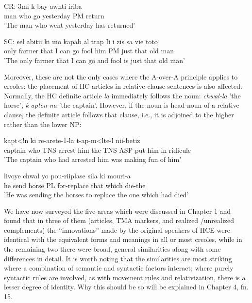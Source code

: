 \ea\label{ex:48}
 \gll CR: 3mi k bay awnti iriba\\
man who go yesterday PM return\\
\glt 'The man who went yesterday has returned'
\z





\ea\label{ex:49}
 SC: sel abitii ki mo kapab al trap Ii i zis sa vie toto\\
 only farmer that I can go fool him PM just that old man  \\
\glt 'The only farmer that I can go and fool is just that old man'
\z



Moreover, these are not the only cases where the A-over-A principle applies to creoles: the placement of HC articles in relative\-
clause sentences is also affected. Normally, the HC definite article \textit{la }immediately follows the noun: \textit{chwal-la} 'the horse', \textit{k} \textit{apten-na} 'the captain'. However, if the noun is head-noun of a relative clause, the definite article follows that clause, i.e., it is adjoined to the higher rather than the lower NP:

\ea\label{ex:50}
\gll kapt{\textless}!n ki re-arete{}-1{}-la t-ap-m{\textless}lte-l nii-betiz\\
captain who TNS-arrest-him-the TNS-ASP-put-him in-ridicule\\
 'The captain who had arrested him was making fun of him'
\glt
\z



\ea\label{ex:51}
 \gll livoye chwal yo pou-riiplase sila ki mouri-a\\
he send horse PL for-replace that which die-the\\
\glt'He was sending the horses to replace the one which had died'
\z





We have now surveyed the five areas which were discussed in Chapter 1 and found that in three of them (articles, TMA markers, and realized /unrealized complements) the ``innovations'' made by the original speakers of HCE were identical with the equivalent forms and meanings in all or most creoles, while in the remaining two there were broad, general similarities along with some differences in detail. It is worth noting that the similarities are most striking where a combi\-nation of semantic and syntactic factors interact; where purely syntactic rules are involved, as with movement rules and relativization, there is a lesser degree of identity. Why this should be so will be explained in Chapter 4, fn. 15.

